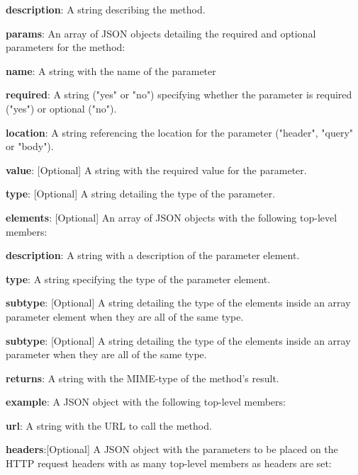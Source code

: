 \begin{myEnumerate}
\begin{myEnumerate}
\begin{myEnumerate}
            \item \textbf{description}: A string describing the method.
            \item \textbf{params}: An array of JSON objects detailing the required and optional parameters for the method:
            \begin{myEnumerate}
                \item \textbf{name}: A string with the name of the parameter
                \item \textbf{required}: A string ("yes" or "no") specifying whether the parameter is required ("yes") or optional ("no").
                \item \textbf{location}: A string referencing the location for the parameter ("header", "query" or "body").
                \item \textbf{value}: [Optional] A string with the required value for the parameter.
                \item \textbf{type}: [Optional] A string detailing the type of the parameter.
                \item \textbf{elements}: [Optional] An array of JSON objects with the following top-level members:
                \begin{myEnumerate}
                    \item \textbf{description}: A string with a description of the parameter element.
                    \item \textbf{type}: A string specifying the type of the parameter element.
                    \item \textbf{subtype}: [Optional] A string detailing the type of the elements inside an array parameter element when they are all of the same type.
                \end{myEnumerate}
                \item \textbf{subtype}: [Optional] A string detailing the type of the elements inside an array parameter when they are all of the same type.
            \end{myEnumerate}
            \item \textbf{returns}: A string with the MIME-type of the method's result.
            \item \textbf{example}: A JSON object with the following top-level members:
            \begin{myEnumerate}
                    \item \textbf{url}: A string with the URL to call the method.
                    \item \textbf{headers}:[Optional] A JSON object with the parameters to be placed on the HTTP request headers with as many top-level members as headers are set:

\end{myEnumerate}
\end{myEnumerate}
\end{myEnumerate}
\end{myEnumerate}
